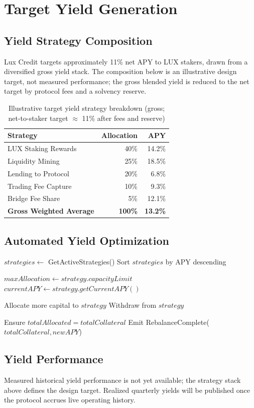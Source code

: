 \section{Target Yield Generation}


\subsection{Yield Strategy Composition}

Lux Credit targets approximately 11\% net APY to LUX stakers, drawn from a
diversified gross yield stack. The composition below is an illustrative design
target, not measured performance; the gross blended yield is reduced to the
net target by protocol fees and a solvency reserve.

\begin{table}[h]
\centering
\begin{tabular}{@{}lrr@{}}
\toprule
\textbf{Strategy} & \textbf{Allocation} & \textbf{APY} \\ \midrule
LUX Staking Rewards & 40\% & 14.2\% \\
Liquidity Mining & 25\% & 18.5\% \\
Lending to Protocol & 20\% & 6.8\% \\
Trading Fee Capture & 10\% & 9.3\% \\
Bridge Fee Share & 5\% & 12.1\% \\ \midrule
\textbf{Gross Weighted Average} & \textbf{100\%} & \textbf{13.2\%} \\ \bottomrule
\end{tabular}
\caption{Illustrative target yield strategy breakdown (gross; net-to-staker target $\approx$ 11\% after fees and reserve)}
\end{table}

\subsection{Automated Yield Optimization}

\begin{algorithm}[H]
\caption{Dynamic Yield Allocation}
\begin{algorithmic}[1]
    \State $strategies \gets$ GetActiveStrategies()
    \State Sort $strategies$ by APY descending
    
        \State $maxAllocation \gets strategy.capacityLimit$
        \State $currentAPY \gets strategy.getCurrentAPY()$
        
            \State Allocate more capital to $strategy$
            \State Withdraw from $strategy$
        \EndIf
    \EndFor
    
    \State Ensure $totalAllocated = totalCollateral$
    \State Emit RebalanceComplete($totalCollateral, newAPY$)
\EndFunction
\end{algorithmic}
\end{algorithm}

\subsection{Yield Performance}

Measured historical yield performance is not yet available; the strategy stack
above defines the design target. Realized quarterly yields will be published
once the protocol accrues live operating history.

